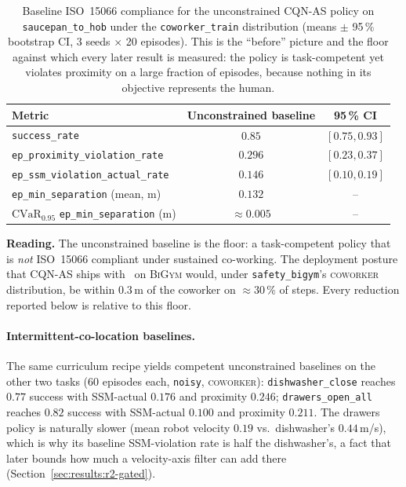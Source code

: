 \documentclass[11pt,a4paper]{report}
\newcommand{\ssm}{SSM}
\newcommand{\iso}{ISO~15066}
\newcommand{\cvar}{\ensuremath{\mathrm{CVaR}}}
\newcommand{\bigym}{\textsc{BiGym}}
\newcommand{\sbigym}{\texttt{safety\_bigym}}
\newcommand{\cqnas}{CQN-AS}
\newcommand{\coworker}{\textsc{coworker}}
\begin{document}
\begin{table}[htbp]
\centering
\caption{Baseline \iso{} compliance for the unconstrained
\cqnas{} policy on \texttt{saucepan\_to\_hob} under the
\texttt{coworker\_train} distribution (means $\pm$ 95\,\% bootstrap
CI, 3 seeds $\times$ 20 episodes). This is the ``before'' picture and
the floor against which every later result is measured: the policy is
task-competent yet violates proximity on a large fraction of
episodes, because nothing in its objective represents the human.}
\label{tab:results:baseline}
\small
\begin{tabular}{lcc}
\toprule
Metric & Unconstrained baseline & 95\,\% CI \\
\midrule
\texttt{success\_rate}                          & $0.85$  & $[0.75, 0.93]$ \\
\texttt{ep\_proximity\_violation\_rate}         & $0.296$ & $[0.23, 0.37]$ \\
\texttt{ep\_ssm\_violation\_actual\_rate}       & $0.146$ & $[0.10, 0.19]$ \\
\texttt{ep\_min\_separation} (mean, m)          & $0.132$ & -- \\
$\cvar_{0.95}$ \texttt{ep\_min\_separation} (m) & $\approx 0.005$ & -- \\
\bottomrule
\end{tabular}
\end{table}

\textbf{Reading.} The unconstrained baseline is the floor: a
task-competent policy that is \emph{not} \iso{} compliant under
sustained co-working. The deployment posture that \cqnas{}
ships with~\cite{seo2024cqnas} on \bigym{} would, under \sbigym{}'s
\coworker{} distribution, be within $0.3$\,m of the coworker on
$\approx$30\,\% of steps. Every reduction reported below is relative to
this floor.

\paragraph{Intermittent-co-location baselines.}
The same curriculum recipe yields competent unconstrained baselines
on the other two tasks (60 episodes each, \texttt{noisy},
\coworker{}): \texttt{dishwasher\_close} reaches $0.77$ success with
\ssm{}-actual $0.176$ and proximity $0.246$;
\texttt{drawers\_open\_all} reaches $0.82$ success with \ssm{}-actual
$0.100$ and proximity $0.211$. The drawers policy is naturally slower
(mean robot velocity $0.19$ vs.\ dishwasher's $0.44$\,m/s), which is
why its baseline \ssm{}-violation rate is half the dishwasher's, a
fact that later bounds how much a velocity-axis filter can add there
(Section~\ref{sec:results:r2-gated}).
\end{document}
